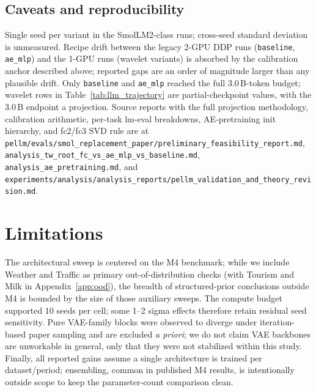 \documentclass[11pt,a4paper]{article}
\begin{document}
\subsection{Caveats and reproducibility}

\begin{sloppypar}
Single seed per variant in the SmolLM2-class runs; cross-seed standard deviation is unmeasured. Recipe drift between the legacy 2-GPU DDP runs (\texttt{baseline}, \texttt{ae\_mlp}) and the 1-GPU runs (wavelet variants) is absorbed by the calibration anchor described above; reported gaps are an order of magnitude larger than any plausible drift. Only \texttt{baseline} and \texttt{ae\_mlp} reached the full 3.0\,B-token budget; wavelet rows in Table~\ref{tab:llm_trajectory} are partial-checkpoint values, with the 3.0\,B endpoint a projection. Source reports with the full projection methodology, calibration arithmetic, per-task lm-eval breakdowns, AE-pretraining init hierarchy, and fc2/fc3 SVD rule are at \nolinkurl{pellm/evals/smol_replacement_paper/preliminary_feasibility_report.md}, \nolinkurl{analysis_tw_root_fc_vs_ae_mlp_vs_baseline.md}, \nolinkurl{analysis_ae_pretraining.md}, and \nolinkurl{experiments/analysis/analysis_reports/pellm_validation_and_theory_revision.md}.
\end{sloppypar}

\section{Limitations}
\label{sec:limitations}

The architectural sweep is centered on the M4 benchmark; while we include Weather and Traffic as primary out-of-distribution checks (with Tourism and Milk in Appendix~\ref{app:ood}), the breadth of structured-prior conclusions outside M4 is bounded by the size of those auxiliary sweeps. The compute budget supported 10 seeds per cell; some 1--2 sigma effects therefore retain residual seed sensitivity. Pure VAE-family blocks were observed to diverge under iteration-based paper sampling and are excluded \emph{a priori}; we do not claim VAE backbones are unworkable in general, only that they were not stabilized within this study. Finally, all reported gains assume a single architecture is trained per dataset/period; ensembling, common in published M4 results, is intentionally outside scope to keep the parameter-count comparison clean.

\end{document}
